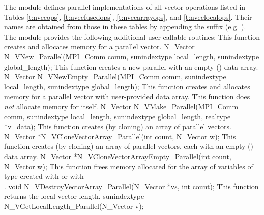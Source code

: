 The {\nvecp} module defines parallel implementations of all vector operations listed
in Tables \ref{t:nvecops}, \ref{t:nvecfusedops}, \ref{t:nvecarrayops},
and \ref{t:nveclocalops}. Their names
are obtained from those in these tables by appending the suffix 
(e.g. ).
The module {\nvecp} provides the following additional
user-callable routines:
{
  This function creates and allocates memory for a parallel vector.
}
{
  N\_Vector N\_VNew\_Parallel(MPI\_Comm comm, sunindextype
  local\_length,
  sunindextype global\_length);
}
{
  This function creates a new parallel  with an empty
  () data array.
}
{
  N\_Vector N\_VNewEmpty\_Parallel(MPI\_Comm comm, sunindextype
  local\_length,
  sunindextype global\_length);
}
{
  This function creates and allocates memory for a parallel vector
  with user-provided data array. This function does {\em not} allocate memory
  for  itself.
}
{
  N\_Vector N\_VMake\_Parallel(MPI\_Comm comm,
  sunindextype local\_length,
  sunindextype global\_length,
  realtype *v\_data);
}
{
  This function creates (by cloning) an array of  parallel vectors.
}
{
  N\_Vector *N\_VCloneVectorArray\_Parallel(int count, N\_Vector w);
}
{
  This function creates (by cloning) an array of  parallel vectors,
  each with an empty () data array.
}
{
  N\_Vector *N\_VCloneVectorArrayEmpty\_Parallel(int count, N\_Vector w);
}
{
  This function frees memory allocated for the array of   variables of
  type  created with  or with \\
  .
}
{
  void N\_VDestroyVectorArray\_Parallel(N\_Vector *vs, int count);
}
{
  This function returns the local vector length.
}
{
  sunindextype N\_VGetLocalLength\_Parallel(N\_Vector v);
}
